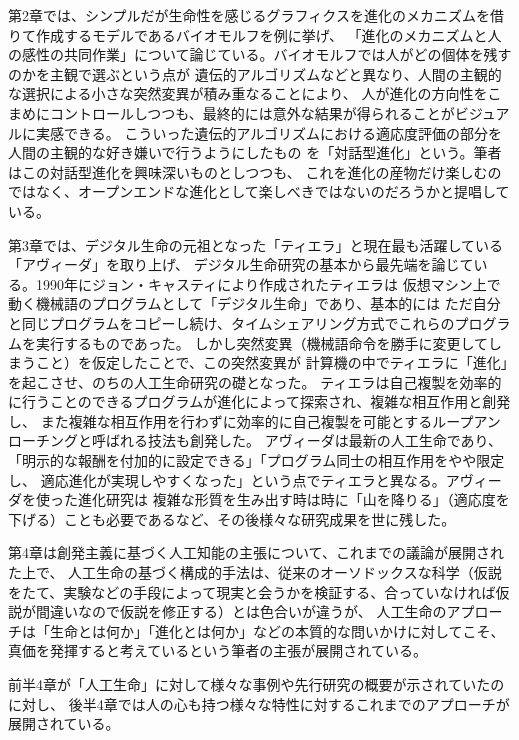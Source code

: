 \documentclass[uplatex]{jsarticle}
\begin{document}
第2章では、シンプルだが生命性を感じるグラフィクスを進化のメカニズムを借りて作成するモデルであるバイオモルフを例に挙げ、
「進化のメカニズムと人の感性の共同作業」について論じている。バイオモルフでは人がどの個体を残すのかを主観で選ぶという点が
遺伝的アルゴリズムなどと異なり、人間の主観的な選択による小さな突然変異が積み重なることにより、
人が進化の方向性をこまめにコントロールしつつも、最終的には意外な結果が得られることがビジュアルに実感できる。
こういった遺伝的アルゴリズムにおける適応度評価の部分を人間の主観的な好き嫌いで行うようにしたもの
を「対話型進化」という。筆者はこの対話型進化を興味深いものとしつつも、
これを進化の産物だけ楽しむのではなく、オープンエンドな進化として楽しべきではないのだろうかと提唱している。

第3章では、デジタル生命の元祖となった「ティエラ」と現在最も活躍している「アヴィーダ」を取り上げ、
デジタル生命研究の基本から最先端を論じている。1990年にジョン・キャスティにより作成されたティエラは
仮想マシン上で動く機械語のプログラムとして「デジタル生命」であり、基本的には
ただ自分と同じプログラムをコピーし続け、タイムシェアリング方式でこれらのプログラムを実行するものであった。
しかし突然変異（機械語命令を勝手に変更してしまうこと）を仮定したことで、この突然変異が
計算機の中でティエラに「進化」を起こさせ、のちの人工生命研究の礎となった。
ティエラは自己複製を効率的に行うことのできるプログラムが進化によって探索され、複雑な相互作用と創発し、
また複雑な相互作用を行わずに効率的に自己複製を可能とするループアンローチングと呼ばれる技法も創発した。
アヴィーダは最新の人工生命であり、「明示的な報酬を付加的に設定できる」「プログラム同士の相互作用をやや限定し、
適応進化が実現しやすくなった」という点でティエラと異なる。アヴィーダを使った進化研究は
複雑な形質を生み出す時は時に「山を降りる」（適応度を下げる）ことも必要であるなど、その後様々な研究成果を世に残した。

第4章は創発主義に基づく人工知能の主張について、これまでの議論が展開された上で、
人工生命の基づく構成的手法は、従来のオーソドックスな科学（仮説をたて、実験などの手段によって現実と会うかを検証する、合っていなければ仮説が間違いなので仮説を修正する）とは色合いが違うが、
人工生命のアプローチは「生命とは何か」「進化とは何か」などの本質的な問いかけに対してこそ、真価を発揮すると考えているという筆者の主張が展開されている。

前半4章が「人工生命」に対して様々な事例や先行研究の概要が示されていたのに対し、
後半4章では人の心も持つ様々な特性に対するこれまでのアプローチが展開されている。
\end{document}
